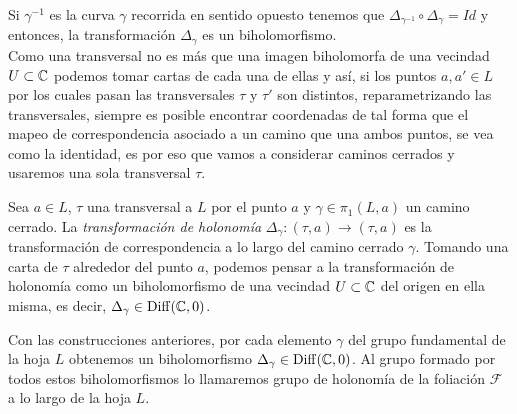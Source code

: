 Si $\gamma^{-1}$ es la curva $\gamma$ recorrida en sentido opuesto tenemos que $\Delta_{\gamma^{-1}}\circ\Delta_{\gamma}=Id$ y entonces, la transformación $\Delta_{\gamma}$ es un biholomorfismo.\\

Como una transversal no es más que una imagen biholomorfa de una vecindad $U\subset\mathbb{C}$ podemos tomar cartas de cada una de ellas y  así, si los puntos $a,a'\in L$ por los cuales pasan las transversales $\tau$ y $\tau'$ son distintos, reparametrizando las transversales, siempre es posible encontrar coordenadas de tal forma que el mapeo de correspondencia asociado a un camino que una ambos puntos, se vea como la identidad, es por eso que vamos a considerar caminos cerrados y usaremos una sola transversal $\tau$.

\begin{defn}
Sea $a\in L$, $\tau$ una transversal a $L$ por el punto $a$ y $\gamma\in\pi_{1}(L,a)$ un camino cerrado. La \emph{transformación de holonomía} $\Delta_{\gamma}\colon (\tau,a)\rightarrow(\tau,a)$ es la transformación de correspondencia a lo largo del camino cerrado $\gamma$. Tomando una carta de $\tau$ alrededor del punto $a$, podemos pensar a la transformación de holonomía como un biholomorfismo de una vecindad $U\subset\mathbb{C}$ del origen en ella misma, es decir, $\Delta_{\gamma}\in \mathrm{Diff}(\mathbb{C},0)$.
\end{defn} 

Con las construcciones anteriores, por cada elemento $\gamma$ del grupo fundamental de la hoja $L$ obtenemos un biholomorfismo $\Delta_{\gamma}\in\mathrm{Diff}(\mathbb{C},0)$. Al grupo formado por todos estos biholomorfismos lo llamaremos grupo de holonomía de la foliación $\mathcal{F}$ a lo largo de la hoja $L$.

